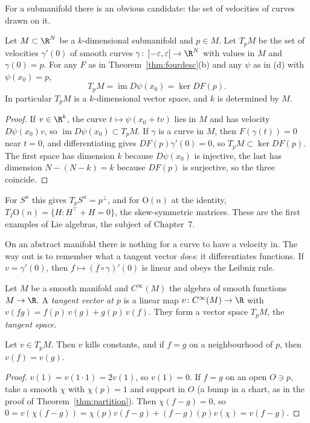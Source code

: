 For a submanifold there is an obvious candidate: the set of velocities of curves drawn on it.

\begin{proposition}\label{prop:tangentsub}
Let $M\subset\R^N$ be a $k$-dimensional submanifold and $p\in M$. Let $T_pM$ be the set of velocities $\gamma'(0)$ of smooth curves
$\gamma\colon\left]-\varepsilon,\varepsilon\right[\to\R^N$ with values in $M$ and $\gamma(0)=p$. For any $F$ as in Theorem~\ref{thm:fourdesc}(b) and any $\psi$
as in (d) with $\psi(x_0)=p$,
\[
T_pM=\operatorname{im}D\psi(x_0)=\ker DF(p).
\]
In particular $T_pM$ is a $k$-dimensional vector space, and $k$ is determined by $M$.
\end{proposition}
\begin{proof}
If $v\in\R^k$, the curve $t\mapsto\psi(x_0+tv)$ lies in $M$ and has velocity $D\psi(x_0)v$, so $\operatorname{im}D\psi(x_0)\subset T_pM$. If $\gamma$ is a curve in $M$,
then $F(\gamma(t))=0$ near $t=0$, and differentiating gives $DF(p)\gamma'(0)=0$, so $T_pM\subset\ker DF(p)$. The first space has dimension $k$ because
$D\psi(x_0)$ is injective, the last has dimension $N-(N-k)=k$ because $DF(p)$ is surjective, so the three coincide.
\end{proof}

For $S^n$ this gives $T_pS^n=p^\perp$, and for $\mathrm O(n)$ at the identity, $T_I\mathrm O(n)=\{H:H^\top+H=0\}$, the skew-symmetric matrices. These are
the first examples of Lie algebras, the subject of Chapter~7.

On an abstract manifold there is nothing for a curve to have a velocity in. The way out is to remember what a tangent vector \emph{does}: it
differentiates functions. If $v=\gamma'(0)$, then $f\mapsto(f\circ\gamma)'(0)$ is linear and obeys the Leibniz rule.

\begin{definition}
Let $M$ be a smooth manifold and $C^\infty(M)$ the algebra of smooth functions $M\to\R$. A \emph{tangent vector at $p$} is a linear map
$v\colon C^\infty(M)\to\R$ with $v(fg)=f(p)\,v(g)+g(p)\,v(f)$. They form a vector space $T_pM$, the \emph{tangent space}.
\end{definition}

\begin{lemma}\label{lem:derivlocal}
Let $v\in T_pM$. Then $v$ kills constants, and if $f=g$ on a neighbourhood of $p$, then $v(f)=v(g)$.
\end{lemma}
\begin{proof}
$v(1)=v(1\cdot1)=2v(1)$, so $v(1)=0$. If $f=g$ on an open $O\ni p$, take a smooth $\chi$ with $\chi(p)=1$ and support in $O$ (a bump in a chart, as in the
proof of Theorem~\ref{thm:partition}). Then $\chi(f-g)=0$, so $0=v(\chi(f-g))=\chi(p)v(f-g)+(f-g)(p)v(\chi)=v(f-g)$.
\end{proof}

